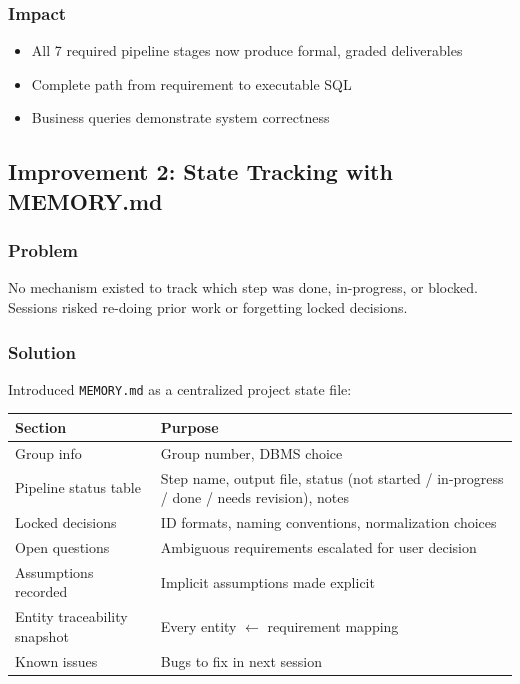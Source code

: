 \documentclass[12pt,a4paper]{article}
\begin{document}
\subsubsection{Impact}
\begin{itemize}
    \item All 7 required pipeline stages now produce formal, graded deliverables
    \item Complete path from requirement to executable SQL
    \item Business queries demonstrate system correctness
\end{itemize}

\subsection{Improvement 2: State Tracking with MEMORY.md}

\subsubsection{Problem}
No mechanism existed to track which step was done, in-progress, or blocked. Sessions risked re-doing prior work or forgetting locked decisions.

\subsubsection{Solution}
Introduced \texttt{MEMORY.md} as a centralized project state file:

\begin{table}[h]
\centering
\begin{tabular}{|l|p{5cm}|}
\hline
\textbf{Section} & \textbf{Purpose} \\
\hline
Group info & Group number, DBMS choice \\
\hline
Pipeline status table & Step name, output file, status (not started / in-progress / done / needs revision), notes \\
\hline
Locked decisions & ID formats, naming conventions, normalization choices \\
\hline
Open questions & Ambiguous requirements escalated for user decision \\
\hline
Assumptions recorded & Implicit assumptions made explicit \\
\hline
Entity traceability snapshot & Every entity $\leftarrow$ requirement mapping \\
\hline
Known issues & Bugs to fix in next session \\
\hline
\end{tabular}
\end{table}
\end{document}
